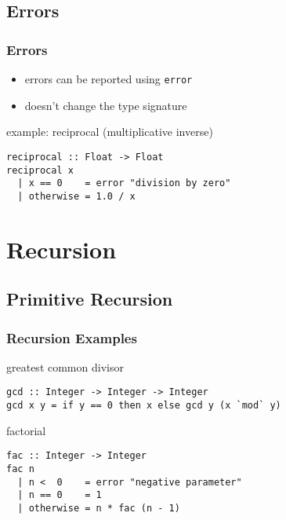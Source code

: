 \documentclass[dvipsnames]{beamer}
\theoremstyle{plain}
\begin{document}
\subsection{Errors}

\begin{frame}[fragile]
  \frametitle{Errors}

  \begin{itemize}
    \item errors can be reported using \lstinline|error|
    \item doesn't change the type signature
  \end{itemize}

  \begin{exampleblock}{example: reciprocal (multiplicative inverse)}
    \begin{lstlisting}
reciprocal :: Float -> Float
reciprocal x
  | x == 0    = error "division by zero"
  | otherwise = 1.0 / x
    \end{lstlisting}
  \end{exampleblock}
\end{frame}

\section{Recursion}


\subsection{Primitive Recursion}

\begin{frame}[fragile]
  \frametitle{Recursion Examples}

  \begin{exampleblock}{greatest common divisor}
    \begin{lstlisting}
gcd :: Integer -> Integer -> Integer
gcd x y = if y == 0 then x else gcd y (x `mod` y)
    \end{lstlisting}
  \end{exampleblock}

  \pause
  \begin{exampleblock}{factorial}
    \begin{lstlisting}
fac :: Integer -> Integer
fac n
  | n <  0    = error "negative parameter"
  | n == 0    = 1
  | otherwise = n * fac (n - 1)
    \end{lstlisting}
  \end{exampleblock}
\end{frame}
\end{document}
